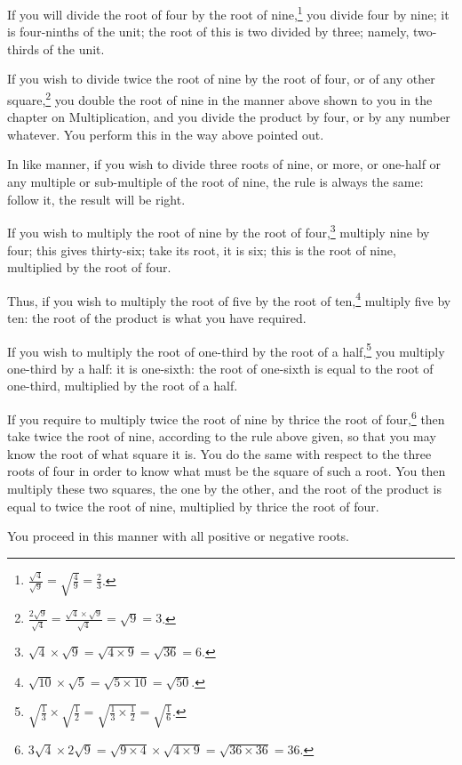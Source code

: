 If you will divide the root of four by the root of nine,\footnote{$\frac{\sqrt{4}}{\sqrt{9}} = \sqrt{\frac{4}{9}} = \frac{2}{3}$.} you divide four by nine; it is four-ninths of the unit; the root of this is two divided by three; namely, two-thirds of the unit.

If you wish to divide twice the root of nine by the root of four, or of any other square,\footnote{$\frac{2\sqrt{9}}{\sqrt{4}} = \frac{\sqrt{4} \times \sqrt{9}}{\sqrt{4}} = \sqrt{9} = 3$.} you double the root of nine in the manner above shown to you in the chapter on Multiplication, and you divide the product by four, or by any number whatever. You perform this in the way above pointed out.

In like manner, if you wish to divide three roots of nine, or more, or one-half or any multiple or sub-multiple of the root of nine, the rule is always the same: follow it, the result will be right.

If you wish to multiply the root of nine by the root of four,\footnote{$\sqrt{4} \times \sqrt{9} = \sqrt{4 \times 9} = \sqrt{36} = 6$.} multiply nine by four; this gives thirty-six; take its root, it is six; this is the root of nine, multiplied by the root of four.

Thus, if you wish to multiply the root of five by the root of ten,\footnote{$\sqrt{10} \times \sqrt{5} = \sqrt{5 \times 10} = \sqrt{50}$.} multiply five by ten: the root of the product is what you have required.

If you wish to multiply the root of one-third by the root of a half,\footnote{$\sqrt{\frac{1}{3}} \times \sqrt{\frac{1}{2}} = \sqrt{\frac{1}{3} \times \frac{1}{2}} = \sqrt{\frac{1}{6}}$.} you multiply one-third by a half: it is one-sixth: the root of one-sixth is equal to the root of one-third, multiplied by the root of a half.

If you require to multiply twice the root of nine by thrice the root of four,\footnote{$3\sqrt{4} \times 2\sqrt{9} = \sqrt{9 \times 4} \times \sqrt{4 \times 9} = \sqrt{36 \times 36} = 36$.} then take twice the root of nine, according to the rule above given, so that you may know the root of what square it is. You do the same with respect to the three roots of four in order to know what must be the square of such a root. You then multiply these two squares, the one by the other, and the root of the product is equal to twice the root of nine, multiplied by thrice the root of four.

You proceed in this manner with all positive or negative roots.

